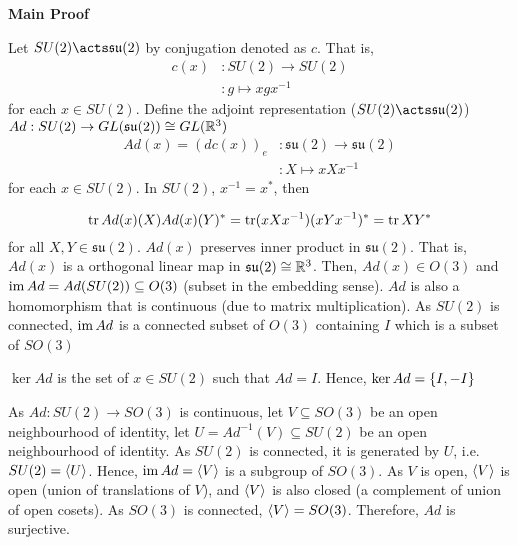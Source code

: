 \documentclass{article}
\begin{document}
\begin{longproof}
\textbf{Main Proof}

Let $SU(2) \acts \mathfrak{su}(2)$ by conjugation denoted as $c$. That is,
\begin{align*}
    c(x)    &: SU(2) \to SU(2) \\
            &: g \mapsto xgx^{-1}
\end{align*}
for each $x \in SU(2)$. Define the adjoint representation ($SU(2) \acts \mathfrak{su}(2)$) $Ad: SU(2) \to GL(\mathfrak{su}(2)) \cong GL(\mathbb{R}^3)$
\begin{align*}
    Ad(x) = (dc(x))_e   &: \mathfrak{su}(2) \to \mathfrak{su}(2) \\
                        &: X \mapsto xXx^{-1}
\end{align*}
for each $x \in SU(2)$. In $SU(2)$, $x^{-1} = x^*$, then

$$
    \operatorname{tr} Ad(x)(X) Ad(x)(Y)^* = \operatorname{tr}(xXx^{-1}) (xYx^{-1})^* = \operatorname{tr} XY^*
$$
for all $X, Y \in \mathfrak{su}(2)$. $Ad(x)$ preserves inner product in $\mathfrak{su}(2)$. That is, $Ad(x)$ is a orthogonal linear map in $\mathfrak{su}(2) \cong \mathbb{R}^3$. Then, $Ad(x) \in O(3)$ and $\operatorname{im} Ad = Ad(SU(2)) \subseteq O(3)$ (subset in the embedding sense). $Ad$ is also a homomorphism that is continuous (due to matrix multiplication). As $SU(2)$ is connected, $\operatorname{im} Ad$ is a connected subset of $O(3)$ containing $I$ which is a subset of $SO(3)$

$\ker Ad$ is the set of $x \in SU(2)$ such that $Ad = I$. Hence, $\ker Ad = \{I, -I\}$

As $Ad: SU(2) \to SO(3)$ is continuous, let $V \subseteq SO(3)$ be an open neighbourhood of identity, let $U = Ad^{-1}(V) \subseteq SU(2)$ be an open neighbourhood of identity. As $SU(2)$ is connected, it is generated by $U$, i.e. $SU(2) = \langle U\rangle$. Hence, $\operatorname{im} Ad = \langle V\rangle$ is a subgroup of $SO(3)$. As $V$ is open, $\langle V\rangle$ is open (union of translations of $V$), and $\langle V\rangle$ is also closed (a complement of union of open cosets). As $SO(3)$ is connected, $\langle V\rangle = SO(3)$. Therefore, $Ad$ is surjective.
\end{longproof}
\end{document}
